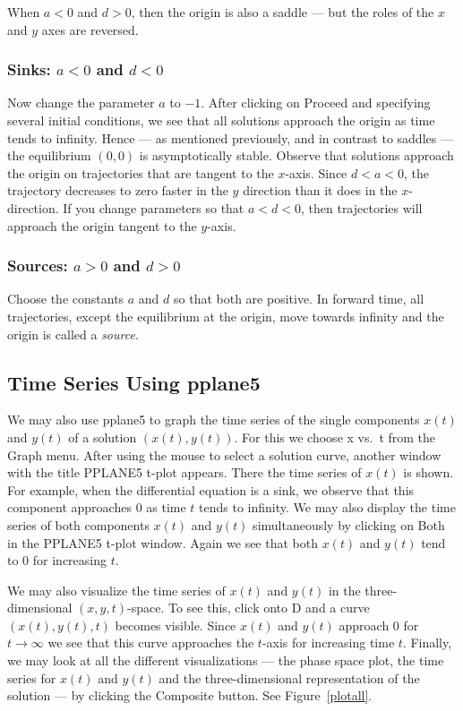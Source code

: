 \documentclass{ximera}
\begin{document}
When $a<0$ and $d>0$, then the origin is also a saddle ---
but the roles of the $x$ and $y$ axes are reversed.

\subsubsection*{Sinks: $a<0$ and $d<0$} 

Now change the parameter $a$ to $-1$. After clicking on {\sf
Proceed} and specifying several initial conditions, we see that
all solutions approach the origin as time tends to infinity.
Hence --- as mentioned previously, and in contrast to saddles ---
the equilibrium $(0,0)$ is asymptotically stable.  Observe that
solutions approach the origin on trajectories that are tangent to
the $x$-axis.  Since $d<a<0$, the trajectory decreases to zero faster
in the $y$ direction than it does in the $x$-direction.  If
you change parameters so that $a<d<0$, then trajectories will
approach the origin tangent to the $y$-axis.

\subsubsection*{Sources: $a>0$ and $d>0$} 

Choose the constants $a$ and $d$ so that both are positive.
In forward time, all trajectories, except the equilibrium at the
origin, move towards infinity and the origin is called a
{\em source\/}.

\subsection*{Time Series Using {\sf pplane5}} 

We may also use {\sf pplane5} to graph the time series of the
single components $x(t)$ and $y(t)$ of a solution $(x(t),y(t))$.
For this we choose {\sf x vs.\ t} from the {\sf Graph} menu.
After using the mouse to select a solution curve, another window
with the title {\sf PPLANE5 t-plot} appears.  There the time
series of $x(t)$ is shown.  For example, when the differential 
equation is a sink, we observe that this component
approaches $0$ as time $t$ tends to infinity.  We may also
display the time series of both components $x(t)$ and $y(t)$
simultaneously by clicking on {\sf Both} in the {\sf PPLANE5 t-plot} 
window.  Again we see that both $x(t)$ and $y(t)$ tend
to $0$ for increasing $t$.

We may also visualize the time series  of
$x(t)$ and $y(t)$ in the three-dimensional $(x,y,t)$-space.  To
see this, click onto { D} and a curve $(x(t),y(t),t)$ 
becomes visible.  Since $x(t)$ and $y(t)$
approach $0$ for $t\to\infty$ we see that this curve
approaches the $t$-axis for increasing time $t$.  Finally, we
may look at all the different visualizations --- the phase space
plot, the time series for $x(t)$ and $y(t)$ and the
three-dimensional representation of the solution --- by clicking
the {\sf Composite} button.  See Figure~\ref{plotall}.
\end{document}
